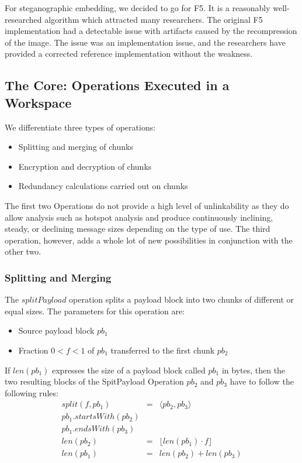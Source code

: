 \documentclass[acmsmall, screen]{acmart}
\begin{document}
For steganographic embedding, we decided to go for F5\cite{f5}. It is a reasonably well-researched algorithm which attracted many researchers. The original F5 implementation had a detectable issue with artifacts\cite{F5broken} caused by the recompression of the image. The issue was an implementation issue, and the researchers have provided a corrected reference implementation without the weakness. %

\subsection{The Core: Operations Executed in a Workspace}
We differentiate three types of operations:
\begin{itemize}
	\item Splitting and merging of chunks
	\item Encryption and decryption of chunks
	\item Redundancy calculations carried out on chunks
\end{itemize}

The first two Operations do not provide a high level of unlinkability as they do allow analysis such as hotspot analysis and produce continuously inclining, steady, or declining message sizes depending on the type of use. The third operation, however, adds a whole lot of new possibilities in conjunction with the other two.

\subsubsection{Splitting and Merging}
The $splitPayload$ operation splits a payload block into two chunks of different or equal sizes. The parameters for this operation are:
\begin{itemize}
	\item Source payload block $pb_1$
	\item Fraction $0<f<1$ of $pb_1$ transferred to the first chunk $pb_2$
\end{itemize}

If $len(pb_1)$ expresses the size of a payload block called $pb_1$ in bytes, then the two resulting blocks of the SpitPayload Operation $pb_2$ and $pb_3$ have to follow the following rules:
\begin{eqnarray}
split(f, pb_1) & = &\langle pb_2, pb_3 \rangle\\
pb_1.startsWith(pb_2)\\
pb_1.endsWith(pb_3)\\
len(pb_2) & = & \lfloor len(pb_1)\cdot f\rfloor\\
len(pb_1) & = & len(pb_2) + len(pb_3)
\end{eqnarray}
\end{document}
